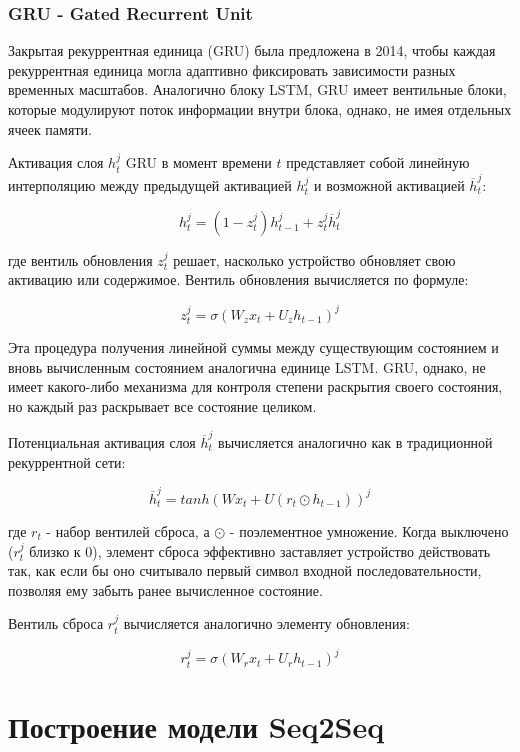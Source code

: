 \documentclass[a4paper,12pt]{article}
\begin{document}
	\clearpage
	
	\subsubsection{GRU - Gated Recurrent Unit}
	
	Закрытая рекуррентная единица (GRU) была предложена в 2014, чтобы каждая рекуррентная единица
	могла адаптивно фиксировать зависимости разных временных масштабов. Аналогично блоку LSTM, GRU имеет
	вентильные блоки, которые модулируют поток информации внутри блока, однако, не имея отдельных
	ячеек памяти.
	
	Активация слоя $h^{j}_{t}$ GRU в момент времени $t$ представляет собой линейную интерполяцию между предыдущей активацией $h^{j}_{t}$ и возможной активацией $\overline{h}^{j}_{t}$:
	
	$$ h^{j}_{t} = (1 - z^{j}_{t})h^{j}_{t - 1} + z^{j}_{t} \overline{h}^{j}_{t} $$
	
	где вентиль обновления $z^{j}_{t}$ решает, насколько устройство обновляет свою активацию или содержимое. Вентиль обновления вычисляется по формуле:
	
 	$$ z^{j}_{t} = \sigma(W_z x_t + U_z h_{t - 1})^j $$

	Эта процедура получения линейной суммы между существующим состоянием и вновь вычисленным состоянием аналогична единице LSTM. GRU, однако, не имеет какого-либо механизма для контроля степени раскрытия своего состояния, но каждый раз раскрывает все состояние целиком.
	
	Потенциальная активация слоя $\overline{h}^{j}_{t}$ вычисляется аналогично как в традиционной рекуррентной сети:
	
	$$ \overline{h}^{j}_{t} = tanh(W x_t + U(r_t \odot h_{t - 1}))^j $$
	
	где $r_t$ - набор вентилей сброса, а $\odot$ - поэлементное умножение. Когда выключено ($r^{j}_{t}$ близко к 0), элемент сброса эффективно заставляет устройство действовать так, как если бы оно считывало первый символ входной последовательности, позволяя ему забыть ранее вычисленное состояние.
	
	Вентиль сброса $r^{j}_{t}$ вычисляется аналогично элементу обновления:
	
	$$ r^{j}_{t} = \sigma(W_r x_t + U_r h_{t - 1})^j $$
	
 	\clearpage
 	
 	\section{Построение модели Seq2Seq}
	
\end{document}
